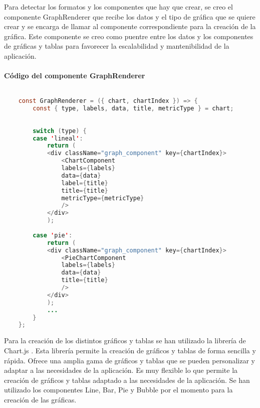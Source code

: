 Para detectar los formatos y los componentes que hay que crear, se creo el componente GraphRenderer que recibe los datos y el
tipo de gráfica que se quiere crear y se encarga de llamar al componente correspondiente para la creación de la gráfica. Este componente
se creo como puentre entre los datos y los componentes de gráficas y tablas para favorecer la escalabilidad y mantenibilidad de la
aplicación. 

\paragraph{Código del componente GraphRenderer}
\begin{lstlisting}[language=Java]
    
    const GraphRenderer = ({ chart, chartIndex }) => {
        const { type, labels, data, title, metricType } = chart;
    
    
        switch (type) {
        case 'lineal':
            return (
            <div className="graph_component" key={chartIndex}>
                <ChartComponent
                labels={labels}
                data={data}
                label={title}
                title={title}
                metricType={metricType}
                />
            </div>
            );
    
        case 'pie':
            return (
            <div className="graph_component" key={chartIndex}>
                <PieChartComponent
                labels={labels}
                data={data}
                title={title}
                />
            </div>
            );
            ...
        }
    };
\end{lstlisting}


Para la creación de los distintos gráficos y tablas se han utilizado la librería de Chart.js \cite{ChartJS}. Esta librería
permite la creación de gráficos y tablas de forma sencilla y rápida. Ofrece una amplia gama de gráficos y tablas que se pueden
personalizar y adaptar a las necesidades de la aplicación. Es muy flexible lo que permite la creación de gráficos y tablas
adaptado a las necesidades de la aplicación. Se han utilizado los componentes Line, Bar, Pie y Bubble por el momento para 
la creación de las gráficas.

